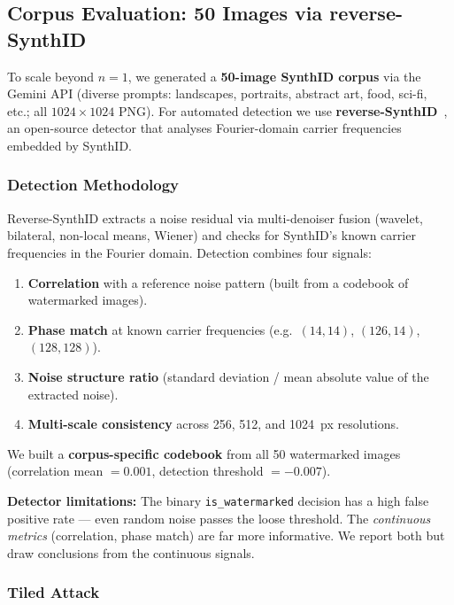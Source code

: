 \documentclass[11pt,a4paper]{article}
\begin{document}
\subsection{Corpus Evaluation: 50 Images via reverse-SynthID}
\label{sec:synthid-corpus}

To scale beyond $n = 1$, we generated a \textbf{50-image SynthID corpus}
via the Gemini API (diverse prompts: landscapes, portraits, abstract art,
food, sci-fi, etc.; all $1024 \times 1024$ PNG). For automated detection we
use \textbf{reverse-SynthID}~\cite{reversesynthid}, an open-source detector
that analyses Fourier-domain carrier frequencies embedded by SynthID.

\subsubsection{Detection Methodology}

Reverse-SynthID extracts a noise residual via multi-denoiser fusion
(wavelet, bilateral, non-local means, Wiener) and checks for SynthID's
known carrier frequencies in the Fourier domain. Detection combines four
signals:

\begin{enumerate}
    \item \textbf{Correlation} with a reference noise pattern (built from
    a codebook of watermarked images).
    \item \textbf{Phase match} at known carrier frequencies (e.g.\
    $(14,14)$, $(126,14)$, $(128,128)$).
    \item \textbf{Noise structure ratio} (standard deviation / mean
    absolute value of the extracted noise).
    \item \textbf{Multi-scale consistency} across 256, 512, and 1024~px
    resolutions.
\end{enumerate}

We built a \textbf{corpus-specific codebook} from all 50 watermarked images
(correlation mean $= 0.001$, detection threshold $= -0.007$).

\textbf{Detector limitations:} The binary \texttt{is\_watermarked} decision
has a high false positive rate --- even random noise passes the loose
threshold. The \emph{continuous metrics} (correlation, phase match) are far
more informative. We report both but draw conclusions from the continuous
signals.

\subsubsection{Tiled Attack}
\end{document}
